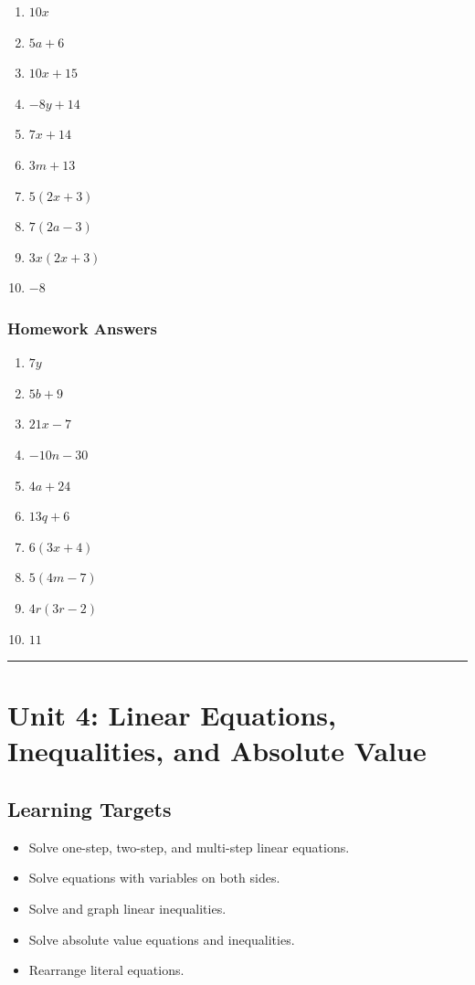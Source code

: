 \documentclass[11pt]{book}
\begin{document}
\begin{enumerate}
\item \(10x\)
\item \(5a+6\)
\item \(10x+15\)
\item \(-8y+14\)
\item \(7x+14\)
\item \(3m+13\)
\item \(5(2x+3)\)
\item \(7(2a-3)\)
\item \(3x(2x+3)\)
\item \(-8\)
\end{enumerate}

\subsection{Homework Answers}

\begin{enumerate}
\item \(7y\)
\item \(5b+9\)
\item \(21x-7\)
\item \(-10n-30\)
\item \(4a+24\)
\item \(13q+6\)
\item \(6(3x+4)\)
\item \(5(4m-7)\)
\item \(4r(3r-2)\)
\item \(11\)
\end{enumerate}

\bigskip\hrule\bigskip

\chapter{Unit 4: Linear Equations, Inequalities, and Absolute Value}

\section{Learning Targets}

\begin{itemize}
\item Solve one-step, two-step, and multi-step linear equations.
\item Solve equations with variables on both sides.
\item Solve and graph linear inequalities.
\item Solve absolute value equations and inequalities.
\item Rearrange literal equations.
\end{itemize}
\end{document}

